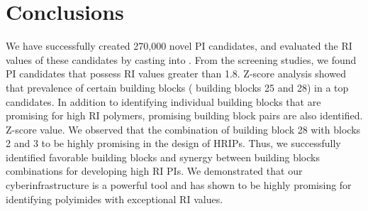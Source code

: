 

\section{Conclusions}
\label{sec:conclusions3}

We have successfully created 270,000 novel PI candidates, and evaluated the RI values of these candidates by casting into \chemhtps. From the screening studies, we found PI candidates that possess RI values greater than 1.8. 
Z-score analysis showed that prevalence of certain building blocks ( \e building blocks 25 and 28) in a top candidates. In addition to identifying individual building blocks that are promising for high RI polymers, promising building block pairs are also identified.  Z-score value. We observed that the combination of building block 28 with blocks 2 and 3 to be highly promising in the design of HRIPs. Thus, we successfully identified favorable building blocks and synergy between building blocks combinations for developing high RI PIs. We demonstrated that our cyberinfrastructure is a powerful tool and has shown to be highly promising for identifying polyimides with exceptional RI values.
